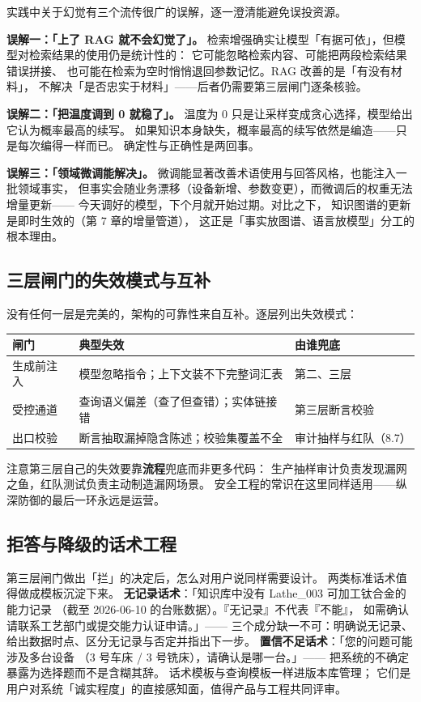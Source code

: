 实践中关于幻觉有三个流传很广的误解，逐一澄清能避免误投资源。

\textbf{误解一：「上了 RAG 就不会幻觉了」。}
检索增强确实让模型「有据可依」，但模型对检索结果的使用仍是统计性的：
它可能忽略检索内容、可能把两段检索结果错误拼接、
也可能在检索为空时悄悄退回参数记忆。RAG 改善的是「有没有材料」，
不解决「是否忠实于材料」——后者仍需要第三层闸门逐条核验。

\textbf{误解二：「把温度调到 0 就稳了」。}
温度为 0 只是让采样变成贪心选择，模型给出它认为概率最高的续写。
如果知识本身缺失，概率最高的续写依然是编造——只是每次编得一样而已。
确定性与正确性是两回事。

\textbf{误解三：「领域微调能解决」。}
微调能显著改善术语使用与回答风格，也能注入一批领域事实，
但事实会随业务漂移（设备新增、参数变更），而微调后的权重无法增量更新——
今天调好的模型，下个月就开始过期。对比之下，
知识图谱的更新是即时生效的（第 7 章的增量管道），
这正是「事实放图谱、语言放模型」分工的根本理由。

\subsection{三层闸门的失效模式与互补}

没有任何一层是完美的，架构的可靠性来自互补。逐层列出失效模式：

\begin{center}
\begin{tabularx}{\linewidth}{@{}lXX@{}}
\toprule
\textbf{闸门} & \textbf{典型失效} & \textbf{由谁兜底} \\
\midrule
生成前注入 & 模型忽略指令；上下文装不下完整词汇表 & 第二、三层 \\
受控通道 & 查询语义偏差（查了但查错）；实体链接错 & 第三层断言校验 \\
出口校验 & 断言抽取漏掉隐含陈述；校验集覆盖不全 & 审计抽样与红队（8.7） \\
\bottomrule
\end{tabularx}
\end{center}

注意第三层自己的失效要靠\textbf{流程}兜底而非更多代码：
生产抽样审计负责发现漏网之鱼，红队测试负责主动制造漏网场景。
安全工程的常识在这里同样适用——纵深防御的最后一环永远是运营。

\subsection{拒答与降级的话术工程}

第三层闸门做出「拦」的决定后，怎么对用户说同样需要设计。
两类标准话术值得做成模板沉淀下来。
\textbf{无记录话术}：「知识库中没有 Lathe\_003 可加工钛合金的能力记录
（截至 2026-06-10 的台账数据）。『无记录』不代表『不能』，
如需确认请联系工艺部门或提交能力认证申请。」——
三个成分缺一不可：明确说无记录、给出数据时点、区分无记录与否定并指出下一步。
\textbf{置信不足话术}：「您的问题可能涉及多台设备
（3 号车床 / 3 号铣床），请确认是哪一台。」——
把系统的不确定暴露为选择题而不是含糊其辞。
话术模板与查询模板一样进版本库管理；
它们是用户对系统「诚实程度」的直接感知面，值得产品与工程共同评审。

